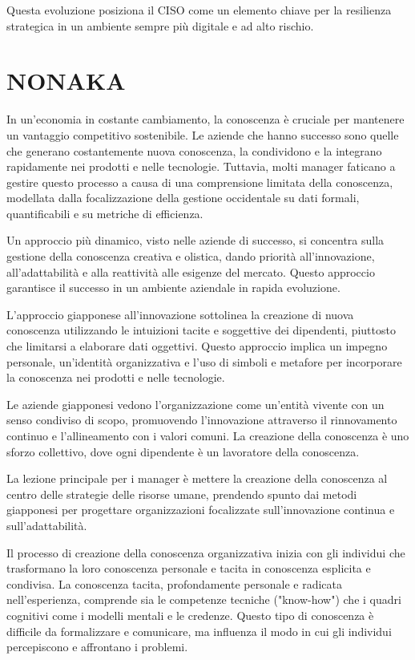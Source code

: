\documentclass{article}
\begin{document}
Questa evoluzione posiziona il CISO come un elemento chiave per la resilienza strategica in un ambiente sempre più digitale e ad alto rischio.


\section{NONAKA}
In un'economia in costante cambiamento, la conoscenza è cruciale per mantenere un vantaggio competitivo sostenibile. Le aziende che hanno successo sono quelle che generano costantemente nuova conoscenza, la condividono e la integrano rapidamente nei prodotti e nelle tecnologie. Tuttavia, molti manager faticano a gestire questo processo a causa di una comprensione limitata della conoscenza, modellata dalla focalizzazione della gestione occidentale su dati formali, quantificabili e su metriche di efficienza.

Un approccio più dinamico, visto nelle aziende di successo, si concentra sulla gestione della conoscenza creativa e olistica, dando priorità all'innovazione, all'adattabilità e alla reattività alle esigenze del mercato. Questo approccio garantisce il successo in un ambiente aziendale in rapida evoluzione.

L'approccio giapponese all'innovazione sottolinea la creazione di nuova conoscenza utilizzando le intuizioni tacite e soggettive dei dipendenti, piuttosto che limitarsi a elaborare dati oggettivi. Questo approccio implica un impegno personale, un'identità organizzativa e l'uso di simboli e metafore per incorporare la conoscenza nei prodotti e nelle tecnologie.

Le aziende giapponesi vedono l'organizzazione come un'entità vivente con un senso condiviso di scopo, promuovendo l'innovazione attraverso il rinnovamento continuo e l'allineamento con i valori comuni. La creazione della conoscenza è uno sforzo collettivo, dove ogni dipendente è un lavoratore della conoscenza.

La lezione principale per i manager è mettere la creazione della conoscenza al centro delle strategie delle risorse umane, prendendo spunto dai metodi giapponesi per progettare organizzazioni focalizzate sull'innovazione continua e sull'adattabilità.

Il processo di creazione della conoscenza organizzativa inizia con gli individui che trasformano la loro conoscenza personale e tacita in conoscenza esplicita e condivisa. La conoscenza tacita, profondamente personale e radicata nell'esperienza, comprende sia le competenze tecniche ("know-how") che i quadri cognitivi come i modelli mentali e le credenze. Questo tipo di conoscenza è difficile da formalizzare e comunicare, ma influenza il modo in cui gli individui percepiscono e affrontano i problemi.
\end{document}
